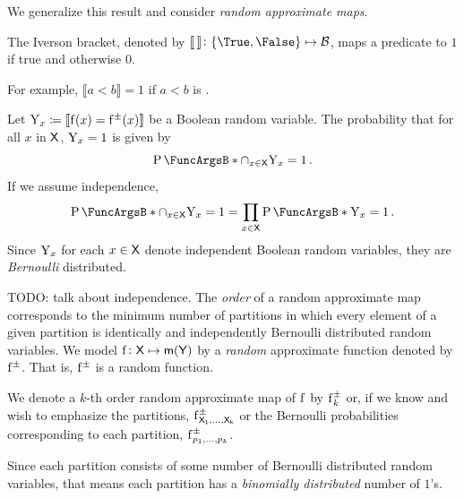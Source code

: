 \documentclass[11pt,final,hidelinks]{article}
\providecommand{\Nothing}{\mathsf{nothing}}
\begin{document}
We generalize this result and consider \emph{random approximate maps}.

\begin{definition}
The Iverson bracket, denoted by $\llbracket \, \rrbracket \colon \{\True,\False\} \mapsto \BitSet$, maps a predicate to $1$ if true and otherwise $0$.
\end{definition}
For example, $\llbracket a<b \rrbracket = 1$ if $a<b$ is \True.

Let $\RV{Y}_{x} \coloneqq \llbracket\Fun{f}(x)=\APFun{f}(x)\rrbracket$ be a Boolean random variable.
The probability that for all $x$ in $\Set{X}$, $\mathrm{Y}_{x} = 1$ is given by
\begin{equation}
	\Prob{\cap_{x \in \Set{X}} \RV{Y}_{x}=1}\,.
\end{equation}
If we assume independence,
\begin{equation}
	\Prob{\cap_{x \in \Set{X}} \RV{Y}_{x}=1} = \prod_{x \in \Set{X}} \Prob{\RV{Y}_{x}=1}\,.
\end{equation}
Since $\mathrm{Y}_{x}$ for each $x \in \Set{X}$ denote independent Boolean random variables, they are \emph{Bernoulli} distributed.

\begin{definition}
TODO: talk about independence.
The \emph{order} of a random approximate map corresponds to the minimum number of partitions in which every element of a given partition is identically and independently Bernoulli distributed random variables.
We model $\Fun{f} \colon \Set{X} \mapsto \Maybe{\Set{Y}}$ by a \emph{random} approximate function denoted by $\Fun{\AT{f}}$.
That is, $\Fun{\AT{f}}$ is a random function.
\end{definition}

We denote a $k$-th order random approximate map of $\Fun{f}$ by $\Fun{f}[k][\pm]$ or, if we know and wish to emphasize the partitions, $\Fun{f}[\Set{X}[1],\ldots,\Set{X}[k]][\pm]$ or the Bernoulli probabilities corresponding to each partition, $\Fun{f}[p_1,\ldots,\p_k][\pm]$.



Since each partition consists of some number of Bernoulli distributed random variables, that means each partition has a \emph{binomially distributed} number of $1$'s.



\end{document}
